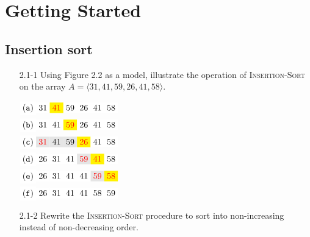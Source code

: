 \chapter{Getting Started}

\section{Insertion sort}

\begin{enumerate}

\item[2.1{-}1]{Using Figure 2.2 as a model, illustrate the operation of
  \textsc{Insertion-Sort} on the array $A = \langle 31, 41, 59, 26, 41, 58 \rangle$.}

\begin{framed}
{\centering $ \displaystyle
\begin{aligned}
  \colorbox{white}{(\texttt{a})} \colorbox{white}{31} \colorbox{yellow}{\textcolor{red}{41}}
  \colorbox{white}{59} \colorbox{white}{26} \colorbox{white}{41} \colorbox{white}{58}\\
%
  \colorbox{white}{(\texttt{b})} \colorbox{white}{31} \colorbox{white}{41} \colorbox{yellow}{\textcolor{red}{59}}
  \colorbox{white}{26} \colorbox{white}{41} \colorbox{white}{58}\\
%
  \colorbox{white}{(\texttt{c})} \colorbox{gray!20}{\textcolor{red}{31}} \colorbox{gray!20}{41} \colorbox{gray!20}{59}
  \colorbox{yellow}{\textcolor{red}{26}} \colorbox{white}{41} \colorbox{white}{58}\\
%
  \colorbox{white}{(\texttt{d})} \colorbox{white}{26} \colorbox{white}{31} \colorbox{white}{41}
  \colorbox{gray!20}{\textcolor{red}{59}} \colorbox{yellow}{\textcolor{red}{41}} \colorbox{white}{58}\\
%
  \colorbox{white}{(\texttt{e})} \colorbox{white}{26} \colorbox{white}{31} \colorbox{white}{41}
  \colorbox{white}{41} \colorbox{gray!20}{\textcolor{red}{59}} \colorbox{yellow}{\textcolor{red}{58}}\\
%
  \colorbox{white}{(\texttt{f})} \colorbox{white}{26} \colorbox{white}{31} \colorbox{white}{41}
  \colorbox{white}{41} \colorbox{white}{58} \colorbox{white}{59}\\
\end{aligned} $ \par} %
\end{framed}

\item[2.1{-}2]{Rewrite the \textsc{Insertion-Sort} procedure to sort into
  non-increasing instead of non-decreasing order.}



\end{enumerate}
